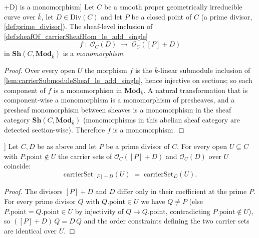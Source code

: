 \begin{lemma}

\leanok
[The inclusion \(\mathcal O_C(D) \hookrightarrow \mathcal O_C([P]+D)\) is a
monomorphism]
  \label{lem:sheafOf_mono_single_add}
  Let \(C\) be a smooth proper geometrically irreducible curve over
  \(\bar k\), let \(D \in \mathrm{Div}(C)\) and let \(P\) be a closed point of
  \(C\) (a prime divisor, \cref{def:prime_divisor}). The sheaf-level inclusion
  of \cref{def:sheafOf_carrierSheafHom_le_add_single}
  \[
    f \;\colon\; \mathcal O_C(D) \;\longrightarrow\; \mathcal O_C([P]+D)
  \]
  in \(\mathbf{Sh}(C, \mathbf{Mod}_{\bar k})\) is a \emph{monomorphism}.
\end{lemma}

\begin{proof}
        \leanok
  Over every open \(U\) the morphism \(f\) is the \(\bar k\)-linear submodule
  inclusion of \cref{lem:carrierSubmoduleSheaf_le_add_single}, hence injective
  on sections; so each component of \(f\) is a monomorphism in
  \(\mathbf{Mod}_{\bar k}\). A natural transformation that is component-wise a
  monomorphism is a monomorphism of presheaves, and a presheaf monomorphism
  between sheaves is a monomorphism in the sheaf category
  \(\mathbf{Sh}(C, \mathbf{Mod}_{\bar k})\) (monomorphisms in this abelian
  sheaf category are detected section-wise). Therefore \(f\) is a monomorphism.
\end{proof}

\begin{lemma}\leanok
[Away from \(P\): the carrier set is unchanged by \([P]\)]
  \label{lem:carrierSet_add_single_eq_of_not_mem}
  Let \(C, D\) be as above and let \(P\) be a prime divisor of \(C\). For every
  open \(U \subseteq C\) with \(P.\mathrm{point} \notin U\) the carrier sets of
  \(\mathcal O_C([P]+D)\) and \(\mathcal O_C(D)\) over \(U\) coincide:
  \[
    \mathrm{carrierSet}_{[P]+D}(U) \;=\; \mathrm{carrierSet}_D(U).
  \]
\end{lemma}

\begin{proof}
  \leanok
  The divisors \([P]+D\) and \(D\) differ only in their coefficient at the prime
  \(P\). For every prime divisor \(Q\) with \(Q.\mathrm{point} \in U\) we have
  \(Q \neq P\) (else \(P.\mathrm{point} = Q.\mathrm{point} \in U\) by injectivity
  of \(Q \mapsto Q.\mathrm{point}\), contradicting \(P.\mathrm{point} \notin U\)), so \(([P]+D)\,Q = D\,Q\) and the
  order constraints defining the two carrier sets are identical over \(U\).
\end{proof}

